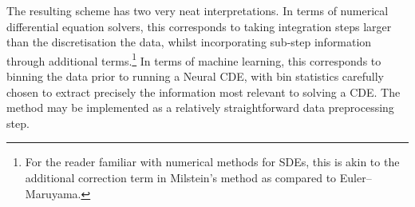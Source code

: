 The resulting scheme has two very neat interpretations. In terms of numerical differential equation solvers, this corresponds to taking integration steps larger than the discretisation the data, whilst incorporating sub-step information through additional terms.\footnote{For the reader familiar with numerical methods for SDEs, this is akin to the additional correction term in Milstein's method as compared to Euler--Maruyama.} In terms of machine learning, this corresponds to binning the data prior to running a Neural CDE, with bin statistics carefully chosen to extract precisely the information most relevant to solving a CDE. The method may be implemented as a relatively straightforward data preprocessing step.




